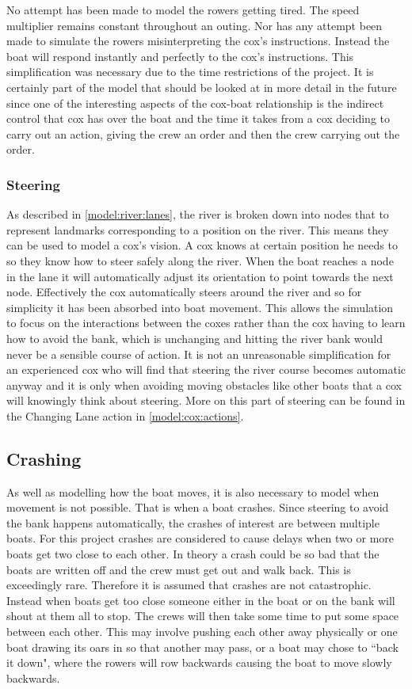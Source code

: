       No attempt has been made to model the rowers getting tired. The speed multiplier remains constant throughout an outing. Nor has any attempt been made to simulate the rowers misinterpreting the cox's instructions. Instead the boat will respond instantly and perfectly to the cox's instructions. This simplification was necessary due to the time restrictions of the project. It is certainly part of the model that should be looked at in more detail in the future since one of the interesting aspects of the cox-boat relationship is the indirect control that cox has over the boat and the time it takes from a cox deciding to carry out an action, giving the crew an order and then the crew carrying out the order.
      
      \subsubsection{Steering}
      As described in \ref{model:river:lanes}, the river is broken down into nodes that to represent landmarks corresponding to a position on the river. This means they can be used to model a cox's vision. A cox knows at certain position he needs to so they know how to steer safely along the river. When the boat reaches a node in the lane it will automatically adjust its orientation to point towards the next node. Effectively the cox automatically steers around the river and so for simplicity it has been absorbed into boat movement. This allows the simulation to focus on the interactions between the coxes rather than the cox having to learn how to avoid the bank, which is unchanging and hitting the river bank would never be a sensible course of action. It is not an unreasonable simplification for an experienced cox who will find that steering the river course becomes automatic anyway and it is only when avoiding moving obstacles like other boats that a cox will knowingly think about steering. More on this part of steering can be found in the Changing Lane action in \ref{model:cox:actions}.
      
      \subsection{Crashing}\label{model:movement:crashing}
      As well as modelling how the boat moves, it is also necessary to model when movement is not possible. That is when a boat crashes. Since steering to avoid the bank happens automatically, the crashes of interest are between multiple boats. For this project crashes are considered to cause delays when two or more boats get two close to each other. In theory a crash could be so bad that the boats are written off and the crew must get out and walk back. This is exceedingly rare. Therefore it is assumed that crashes are not catastrophic. Instead when boats get too close someone either in the boat or on the bank will shout at them all to stop. The crews will then take some time to put some space between each other. This may involve pushing each other away physically or one boat drawing its oars in so that another may pass, or a boat may chose to ``back it down", where the rowers will row backwards causing the boat to move slowly backwards.
        

